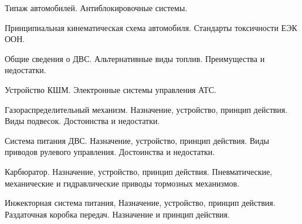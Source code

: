 \documentclass[
	14pt,
	a4paper,
	]
	{scrartcl}
\begin{document}
\shapk
{}
\setcounter{zad}{0}

\vfill
\z Типаж автомобилей.
 \vfill
\z Антиблокировочные системы. \vfill

\vfill

\newpage


\shapk
{}
\setcounter{zad}{0}

\vfill
\z Принципиальная кинематическая схема автомобиля.
 \vfill
\z Стандарты токсичности ЕЭК ООН.
 \vfill

\vfill

\newpage


\shapk
{}
\setcounter{zad}{0}

\vfill
\z Общие сведения о ДВС.
 \vfill
\z Альтернативные виды топлив. Преимущества и недостатки.
 \vfill

\vfill

\newpage


\shapk
{}
\setcounter{zad}{0}

\vfill
\z Устройство КШМ.
 \vfill
\z Электронные системы управления АТС.
 \vfill

\vfill

\newpage


\shapk
{}
\setcounter{zad}{0}

\vfill
\z Газораспределительный механизм. Назначение, устройство, принцип действия.
 \vfill
\z Виды подвесок. Достоинства и недостатки.
 \vfill

\vfill

\newpage


\shapk
{}
\setcounter{zad}{0}

\vfill
\z Система питания ДВС. Назначение, устройство, принцип действия.
 \vfill
\z Виды приводов рулевого управления. Достоинства и недостатки.
 \vfill

\vfill

\newpage


\shapk
{}
\setcounter{zad}{0}

\vfill
\z Карбюратор. Назначение, устройство, принцип действия.
 \vfill
\z Пневматические, механические и гидравлические приводы тормозных механизмов. 
 \vfill

\vfill

\newpage


\shapk
{}
\setcounter{zad}{0}

\vfill
\z Инжекторная система питания, Назначение, устройство, принцип действия.
 \vfill
\z Раздаточная коробка передач. Назначение и принцип действия.
 \vfill
\end{document}
